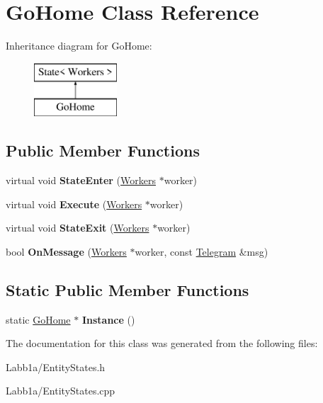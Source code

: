 \hypertarget{class_go_home}{}\section{Go\+Home Class Reference}
\label{class_go_home}
Inheritance diagram for Go\+Home\+:\begin{figure}[H]
\begin{center}
\leavevmode
\includegraphics[height=2.000000cm]{class_go_home}
\end{center}
\end{figure}
\subsection*{Public Member Functions}
\begin{DoxyCompactItemize}
\item 
\hypertarget{class_go_home_a82f45f37c4a91ced544ffed1261e3ab8}{}virtual void {\bfseries State\+Enter} (\hyperlink{class_workers}{Workers} $\ast$worker)\label{class_go_home_a82f45f37c4a91ced544ffed1261e3ab8}

\item 
\hypertarget{class_go_home_a19fd88f9340c496e918f4af6e1dbc0e6}{}virtual void {\bfseries Execute} (\hyperlink{class_workers}{Workers} $\ast$worker)\label{class_go_home_a19fd88f9340c496e918f4af6e1dbc0e6}

\item 
\hypertarget{class_go_home_a36c098bc3ed3fe54222d9e45339b6cc0}{}virtual void {\bfseries State\+Exit} (\hyperlink{class_workers}{Workers} $\ast$worker)\label{class_go_home_a36c098bc3ed3fe54222d9e45339b6cc0}

\item 
\hypertarget{class_go_home_a48a6203c9c883bc4bafd72ab6251d107}{}bool {\bfseries On\+Message} (\hyperlink{class_workers}{Workers} $\ast$worker, const \hyperlink{struct_telegram}{Telegram} \&msg)\label{class_go_home_a48a6203c9c883bc4bafd72ab6251d107}

\end{DoxyCompactItemize}
\subsection*{Static Public Member Functions}
\begin{DoxyCompactItemize}
\item 
\hypertarget{class_go_home_a2b19822453e4e81f6b6f057fbdb2ec7d}{}static \hyperlink{class_go_home}{Go\+Home} $\ast$ {\bfseries Instance} ()\label{class_go_home_a2b19822453e4e81f6b6f057fbdb2ec7d}

\end{DoxyCompactItemize}


The documentation for this class was generated from the following files\+:\begin{DoxyCompactItemize}
\item 
Labb1a/Entity\+States.\+h\item 
Labb1a/Entity\+States.\+cpp\end{DoxyCompactItemize}
